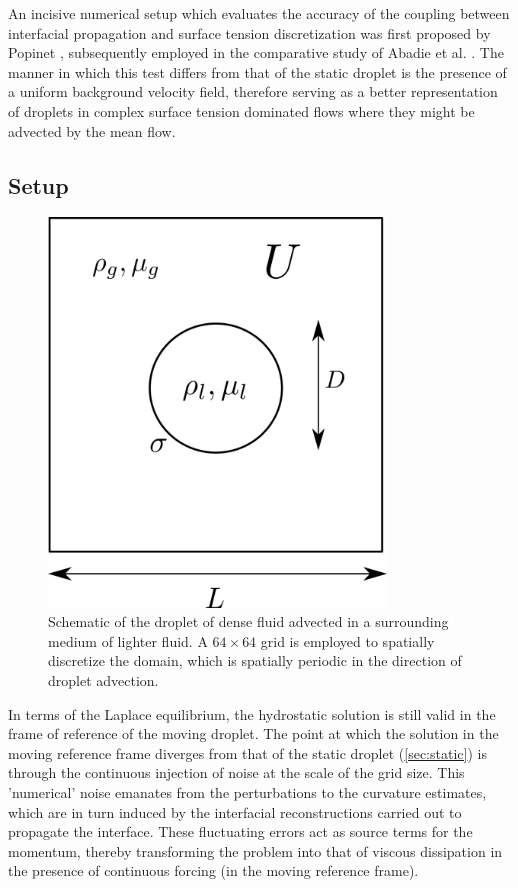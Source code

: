 An incisive numerical setup which evaluates the accuracy of the coupling between interfacial propagation and surface tension discretization was first proposed by Popinet \cite{popinet2009accurate}, subsequently employed in the comparative study of Abadie et al. . The manner in which this test differs from that of the static droplet is the presence of a uniform background velocity field, therefore serving as a better representation of droplets in complex surface tension dominated flows where they might be advected by the mean flow.

\subsection*{Setup}

\begin{figure}[h!]
    \centering
    \includegraphics[width = 0.8\textwidth]{plots/droplet_advect/config.png}
    \caption{Schematic of the droplet of dense fluid advected in a surrounding medium of lighter fluid. A $64 \times 64$ grid is employed to spatially discretize the domain, which is spatially periodic in the direction of droplet advection.}
    \label{moving_conf}
\end{figure}

In terms of the Laplace equilibrium, the hydrostatic solution is still valid in the frame of reference of the moving droplet. The point at which the solution in the moving reference frame diverges from that of the static droplet (\ref{sec:static}) is through the continuous injection of noise at the scale of the grid size. This 'numerical' noise emanates from the perturbations to the curvature estimates, which are in turn induced by the interfacial reconstructions carried out to propagate the interface. These fluctuating errors act as source terms for the momentum, thereby transforming the problem into that of viscous dissipation in the presence of continuous forcing (in the moving reference frame).


